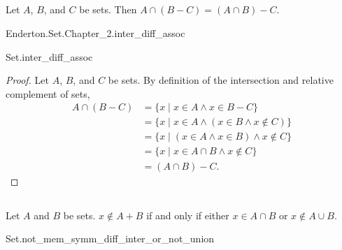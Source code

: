 \documentclass{report}
\begin{document}
\subsection{}%

  Let $A$, $B$, and $C$ be sets.
  Then $A \cap (B - C) = (A \cap B) - C$.

    {Enderton.Set.Chapter\_2.inter\_diff\_assoc}

    {Set.inter\_diff\_assoc}

  \begin{proof}
    Let $A$, $B$, and $C$ be sets.
    By definition of the intersection and relative complement of sets,
      \begin{align*}
        A \cap (B - C)
          & = \{ x \mid x \in A \land x \in B - C \} \\
          & = \{ x \mid x \in A \land (x \in B \land x \not\in C) \} \\
          & = \{ x \mid (x \in A \land x \in B) \land x \not\in C \} \\
          & = \{ x \mid x \in A \cap B \land x \not \in C \} \\
          & = (A \cap B) - C.
      \end{align*}
  \end{proof}

\subsection{}

  Let $A$ and $B$ be sets. $x \not\in A + B$ if and only if either
    $x \in A \cap B$ or $x \not\in A \cup B$.

    {Set.not\_mem\_symm\_diff\_inter\_or\_not\_union}
\end{document}
